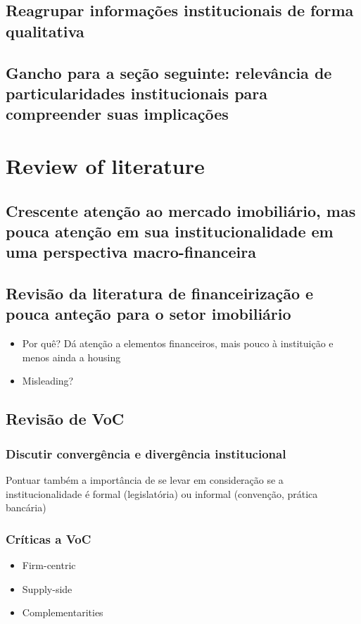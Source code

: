 \documentclass{SelfArx}
\begin{document}
\subsection*{Reagrupar informações institucionais de forma qualitativa}
\label{sec:org85d9044}
\subsection*{Gancho para a seção seguinte: relevância de particularidades institucionais para compreender suas implicações}
\label{sec:orgbfeed74}
\section*{Review of literature}
\label{sec:org9213916}
\subsection*{Crescente atenção ao mercado imobiliário, mas pouca atenção em sua institucionalidade em uma perspectiva macro-financeira}
\label{sec:org1aa3133}
\subsection*{Revisão da literatura de financeirização e pouca anteção para o setor imobiliário}
\label{sec:org8ab0273}
\begin{itemize}
\item Por quê? Dá atenção a elementos financeiros, mais pouco à instituição e menos ainda a housing
\item Misleading?
\end{itemize}
\subsection*{Revisão de VoC}
\label{sec:org57609da}
\subsubsection*{Discutir convergência e divergência institucional}
\label{sec:org32d78d2}
Pontuar também a importância de se levar em consideração se a institucionalidade é formal (legislatória) ou informal (convenção, prática bancária)
\subsubsection*{Críticas a VoC}
\label{sec:org2ef062e}
\begin{itemize}
\item Firm-centric
\item Supply-side
\item Complementarities
\end{itemize}
\end{document}
